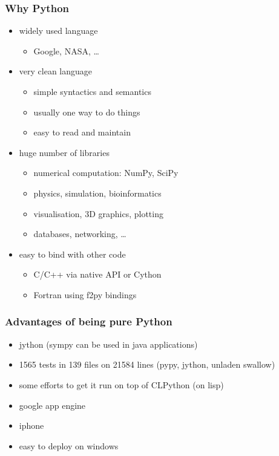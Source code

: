 \documentclass[handout]{beamer}
\begin{document}
\begin{frame}[fragile]
    \frametitle{Why Python}

    \begin{itemize}
        \item<1-> widely used language
            \begin{itemize}
                \item Google, NASA, \ldots
            \end{itemize}
        \item<2-> very clean language
            \begin{itemize}
                \item simple syntactics and semantics
                \item usually one way to do things
                \item easy to read and maintain
            \end{itemize}
        \item<3-> huge number of libraries
            \begin{itemize}
                \item numerical computation: NumPy, SciPy
                \item physics, simulation, bioinformatics
                \item visualisation, 3D graphics, plotting
                \item databases, networking, \ldots
            \end{itemize}
        \item<4-> easy to bind with other code
            \begin{itemize}
                \item C/C++ via native API or Cython
                \item Fortran using f2py bindings
            \end{itemize}
    \end{itemize}
\end{frame}

\begin{frame}[fragile]
    \frametitle{Advantages of being pure Python}
    \begin{itemize}
        \item jython (sympy can be used in java applications)
        \item 1565 tests in 139 files on 21584 lines (pypy, jython, unladen swallow)
        \item some efforts to get it run on top of CLPython (on lisp)
        \item google app engine
        \item iphone
        \item easy to deploy on windows
    \end{itemize}
\end{frame}
\end{document}
